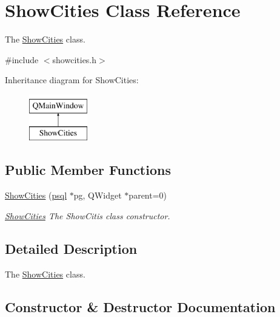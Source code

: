 \hypertarget{class_show_cities}{}\section{Show\+Cities Class Reference}
\label{class_show_cities}


The \hyperlink{class_show_cities}{Show\+Cities} class.  




{\ttfamily \#include $<$showcities.\+h$>$}

Inheritance diagram for Show\+Cities\+:\begin{figure}[H]
\begin{center}
\leavevmode
\includegraphics[height=2.000000cm]{class_show_cities}
\end{center}
\end{figure}
\subsection*{Public Member Functions}
\begin{DoxyCompactItemize}
\item 
\hyperlink{class_show_cities_ac5da430ddf0de0beb8afeb40bd6aa206}{Show\+Cities} (\hyperlink{classpsql}{psql} $\ast$pg, Q\+Widget $\ast$parent=0)
\begin{DoxyCompactList}\small\item\em \hyperlink{class_show_cities}{Show\+Cities} The Show\+Citis class constructor. \end{DoxyCompactList}\end{DoxyCompactItemize}


\subsection{Detailed Description}
The \hyperlink{class_show_cities}{Show\+Cities} class. 

\subsection{Constructor \& Destructor Documentation}
\mbox{\label{class_show_cities_ac5da430ddf0de0beb8afeb40bd6aa206}} 
